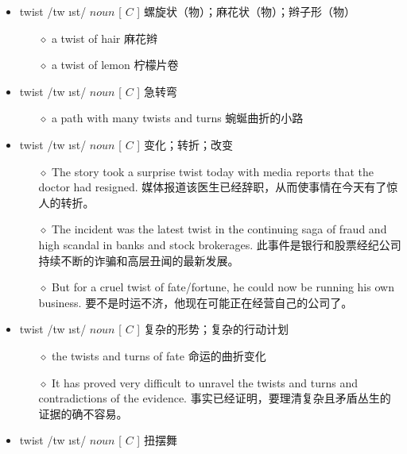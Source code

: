 \documentclass[a4paper,top=2.5cm,buttom=2.5cm10.5pt]{book}
\begin{document}
\begin{itemize}
\item twist /tw \i st/ $ noun $ [  $ C $  ] 螺旋状（物）；麻花状（物）；辫子形（物）
\begin{itemize}
\item[$\diamond$] a twist of hair
麻花辫
\item[$\diamond$] a twist of lemon
柠檬片卷
\end{itemize}
\end{itemize}
\begin{itemize}
\item twist /tw \i st/ $ noun $ [  $ C $  ] 急转弯
\begin{itemize}
\item[$\diamond$] a path with many twists and turns
蜿蜒曲折的小路
\end{itemize}
\end{itemize}
\begin{itemize}
\item twist /tw \i st/ $ noun $ [  $ C $  ] 变化；转折；改变
\begin{itemize}
\item[$\diamond$] The story took a surprise twist today with media reports that the doctor had resigned.
媒体报道该医生已经辞职，从而使事情在今天有了惊人的转折。
\item[$\diamond$] The incident was the latest twist in the continuing saga of fraud and high scandal in banks and stock brokerages.
此事件是银行和股票经纪公司持续不断的诈骗和高层丑闻的最新发展。
\item[$\diamond$] But for a cruel twist of fate/fortune, he could now be running his own business.
要不是时运不济，他现在可能正在经营自己的公司了。
\end{itemize}
\end{itemize}
\begin{itemize}
\item twist /tw \i st/ $ noun $ [  $ C $  ] 复杂的形势；复杂的行动计划
\begin{itemize}
\item[$\diamond$] the twists and turns of fate
命运的曲折变化
\item[$\diamond$] It has proved very difficult to unravel the twists and turns and contradictions of the evidence.
事实已经证明，要理清复杂且矛盾丛生的证据的确不容易。
\end{itemize}
\end{itemize}
\begin{itemize}
\item twist /tw \i st/ $ noun $ [  $ C $  ] 扭摆舞
\end{itemize}
\end{document}

